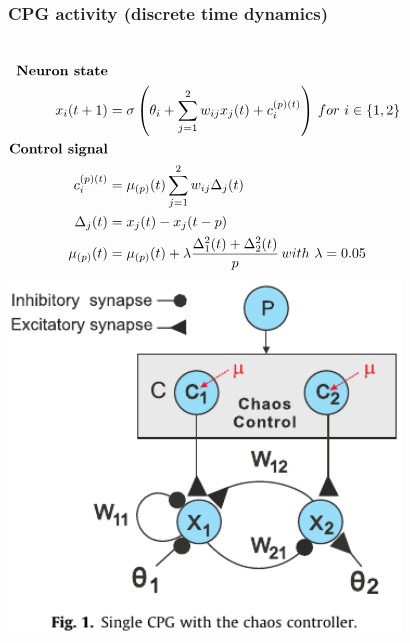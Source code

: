 \documentclass{beamer}
\begin{document}
\begin{frame}
\frametitle{CPG activity (discrete time dynamics)}

\begin{columns}
\begin{align*}
\text{\textbf{Neuron state}}&\\
x_i(t+1) &= \sigma\left(\theta_i + \sum\limits^2_{j=1}w_{ij} x_j(t) + c_i^{(p)(t)}\right) \, for~i \in \{1,2\}\\
\text{\textbf{Control signal}}&\\
c_i^{(p)(t)} &= \mu_{(p)}(t)\sum\limits^{2}_{j=1}w_{ij}\Delta_j(t)\\
\Delta_j(t) &= x_j(t) - x_j(t-p)\\
\mu_{(p)}(t) &= \mu_{(p)}(t) + \lambda\frac{\Delta^2_1(t) + \Delta^2_2(t)}{p} \, with~\lambda=0.05
\end{align*}
\vspace*{-1.2cm}
\hspace*{-1.5cm}
\includegraphics[width=1.5\textwidth]{figs/CPG-overview.pdf}
\end{columns}
\end{frame}
\end{document}
